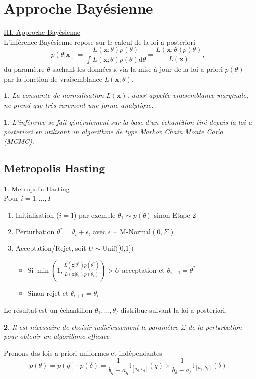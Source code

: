 \documentclass[8pt,notheorems]{beamer}
\newtheorem{problem}{\translate{Problem}}
\newtheorem{remark}{\translate{Remark}}
\theoremstyle{definition}
\theoremstyle{example}
\theoremstyle{mystyle}
\theoremstyle{plain}
\begin{document}
\section{Approche Bayésienne}
\begin{frame}
\underline{III. Approche Bayésienne}\\
L'inférence Bayésienne repose sur le calcul de la loi a posteriori
\begin{equation}\label{eq:a_posteriori}
p(\theta|\mathbf{x}) = \frac{L(\mathbf{x};\theta)p(\theta)}{\int L(\mathbf{x};\theta)p(\theta)\text{d}\theta} = \frac{L(\mathbf{x};\theta)p(\theta)}{L(\mathbf{x})},
\end{equation}
du paramètre $\theta$ sachant les données $\mathbb{x}$ via la mise à jour de la loi a priori $p(\theta)$ par la fonction de vraisemblance $L(\mathbf{x};\theta)$. 
\begin{problem}
La constante de normalisation $L(\mathbf{x})$, aussi appelée vraisemblance marginale, ne prend que très rarement une forme analytique. 
\end{problem}
\begin{remark}
L'inférence se fait généralement sur la base d'un échantillon tiré depuis la loi a posteriori en utilisant un algorithme de type \textit{Markov Chain Monte Carlo} (MCMC). 
\end{remark}
\end{frame}
\subsection{Metropolis Hasting}
\begin{frame}
\underline{1. Metropolis-Hasting}\\


Pour $i=1,...,I$
\begin{enumerate}
\item Initialisation ($i = 1$) par exemple $\theta_1\sim p(\theta)$ sinon Etape 2
\item Perturbation $\theta^\ast = \theta_i + \epsilon$, avec $\epsilon\sim\text{M-Normal}(0,\Sigma)$
\item Acceptation/Rejet, soit $U\sim\text{Unif([0,1])}$
\begin{itemize}
    \item Si $\min\left(1, \frac{L(\mathbf{x}|\theta^\ast)p(\theta^\ast)}{L(\mathbf{x}|\theta_i)p(\theta_i)}\right)> U$ acceptation et $\theta_{i+1} = \theta^\ast$ 
    \item Sinon rejet et $\theta_{i+1} = \theta_i$
\end{itemize}
\end{enumerate}   
Le résultat est un échantillon $\theta_1,\ldots, \theta_I$ distribué suivant la loi a posteriori. 
\begin{remark}
Il est nécessaire de choisir judicieusement le paramètre $\Sigma$ de la perturbation pour obtenir un algorithme efficace. 
\end{remark}

Prenons des lois a priori uniformes et indépendantes
$$
p(\theta) = p(q)\cdot p(\delta) =\frac{1}{b_q- a_q}\mathbb{I}_{[a_q,b_q]}(q)\times \frac{1}{b_\delta- a_\delta}\mathbb{I}_{[a_\delta,b_\delta]}(\delta)
$$
\end{frame}
\end{document}
